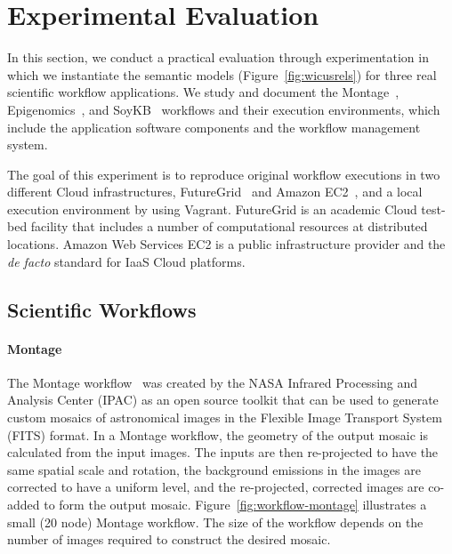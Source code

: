 \section{Experimental Evaluation}
\label{sec:experiment}

In this section, we conduct a practical evaluation through experimentation in 
which we instantiate the semantic models (Figure~\ref{fig:wicusrels}) for three real 
scientific workflow applications. We study and document the Montage~\cite{Montage},
Epigenomics~\cite{genome}, and SoyKB~\cite{soybean, Joshi01012014} workflows 
and their execution environments, which include the application software components 
and the workflow management system.

The goal of this experiment is to reproduce original workflow executions in two different 
Cloud infrastructures, FutureGrid~\cite{futuregrid} and Amazon EC2~\cite{aws}, and a
local execution environment by using Vagrant. 
FutureGrid is an academic Cloud test-bed facility that includes a number of computational 
resources at distributed locations. Amazon Web Services EC2 is a public infrastructure 
provider and the \emph{de facto} standard for IaaS Cloud platforms.


\subsection{Scientific Workflows}

\paragraph{\textbf{Montage}}
The Montage workflow~\cite{Montage} was created by the NASA Infrared Processing 
and Analysis Center (IPAC) as an open source toolkit that can be used to generate 
custom mosaics of astronomical images in the Flexible Image Transport System (FITS) 
format. In a Montage workflow, the geometry of the output mosaic is calculated from the 
input images. The inputs are then re-projected to have the same spatial scale and rotation, 
the background emissions in the images are corrected to have a uniform level, and the 
re-projected, corrected images are co-added to form the output mosaic. 
Figure~\ref{fig:workflow-montage} illustrates a small (20 node) Montage workflow. The 
size of the workflow depends on the number of images required to construct the desired 
mosaic.

